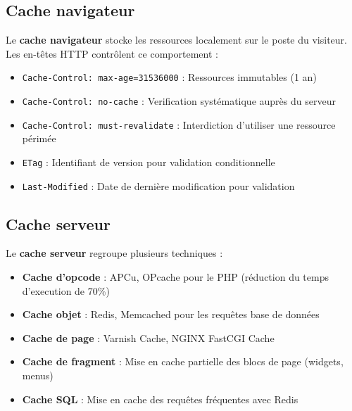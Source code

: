 \documentclass[12pt,a4paper,twoside]{report}
\newcommand{\keyword}[1]{\textbf{\textcolor{googleblue}{#1}}}
\begin{document}
\subsection{Cache navigateur}

Le \keyword{cache navigateur} stocke les ressources localement sur le poste du visiteur. Les en-têtes HTTP contrôlent ce comportement :

\begin{itemize}
    \item \texttt{Cache-Control: max-age=31536000} : Ressources immutables (1 an)
    \item \texttt{Cache-Control: no-cache} : Verification systématique auprès du serveur
    \item \texttt{Cache-Control: must-revalidate} : Interdiction d'utiliser une ressource périmée
    \item \texttt{ETag} : Identifiant de version pour validation conditionnelle
    \item \texttt{Last-Modified} : Date de dernière modification pour validation
\end{itemize}

\subsection{Cache serveur}

Le \keyword{cache serveur} regroupe plusieurs techniques :

\begin{itemize}
    \item \textbf{Cache d'opcode} : APCu, OPcache pour le PHP (réduction du temps d'execution de 70\%)
    \item \textbf{Cache objet} : Redis, Memcached pour les requêtes base de données
    \item \textbf{Cache de page} : Varnish Cache, NGINX FastCGI Cache
    \item \textbf{Cache de fragment} : Mise en cache partielle des blocs de page (widgets, menus)
    \item \textbf{Cache SQL} : Mise en cache des requêtes fréquentes avec Redis
\end{itemize}
\end{document}
